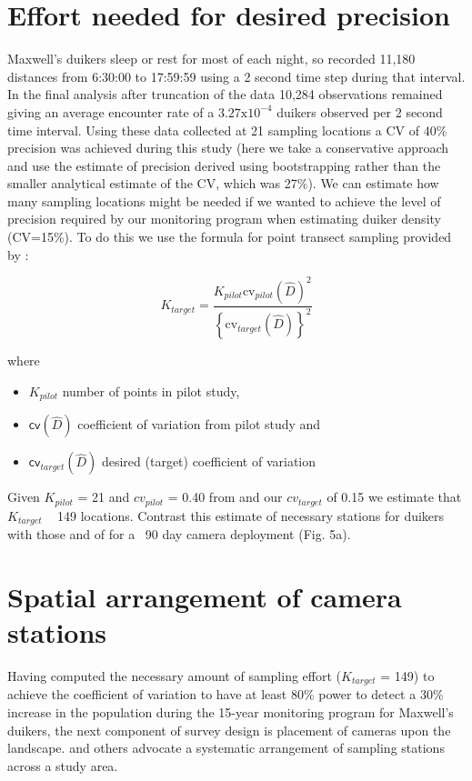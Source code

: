 \documentclass[a4paper, 10pt]{article}
\begin{document}
\section{Effort needed for desired precision}

Maxwell’s duikers sleep or rest for most of each night, so \citet{howeetal}  recorded 11,180 distances from 6:30:00 to 17:59:59 using a 2 second time step during that interval. In the final analysis after truncation of the data 10,284 observations remained giving an average encounter rate of a $3.27 \mbox{x}10^{-4}$ duikers observed per 2 second time interval. Using these data collected at 21 sampling locations a CV of  40\% precision was achieved during this study (here we take a conservative approach and use the estimate of precision derived using bootstrapping rather than the smaller analytical estimate of the CV, which was 27\%). We can estimate how many sampling locations might be needed if we wanted to achieve the level of precision required by our monitoring program when estimating duiker density (CV=15\%). To do this we use the formula for point transect sampling provided by \citet{Bucklandbook}:

\begin{equation}
K_{target}=\frac{K_{pilot}{\mbox{cv}_{pilot}(\hat{D})^{2}}}{{\left\{\mbox{cv}_{target}(\hat{D})\right\}^{2}}}
\end{equation}

where
\begin{itemize}
	\item $K_{pilot}$ number of points in pilot study, 
	\item $\textsf{cv}(\hat{D})$ coefficient of variation from pilot study and
	\item $\textsf{cv}_{target}(\hat{D})$ desired (target) coefficient of variation
\end{itemize}

Given $K_{pilot}$ = 21 and $cv_{pilot}$ = 0.40 from \citet{howeetal} and our $cv_{target}$ of 0.15 we estimate that $K_{target}$ ~ 149 locations. Contrast this estimate of necessary stations for duikers with those and of \cite{cappelle_estimating_2021} for a ~90 day camera deployment (Fig. 5a).

\section{Spatial arrangement of camera stations}

Having computed the necessary amount of sampling effort ($K_{target}$ = 149) to achieve the coefficient of variation to have at least 80\% power to detect a 30\% increase in the population during the 15-year monitoring program for Maxwell’s duikers, the next component of survey design is placement of cameras upon the landscape. \citet{laguardia_assessing_2021} and others advocate a systematic arrangement of sampling stations across a study area.
\end{document}
